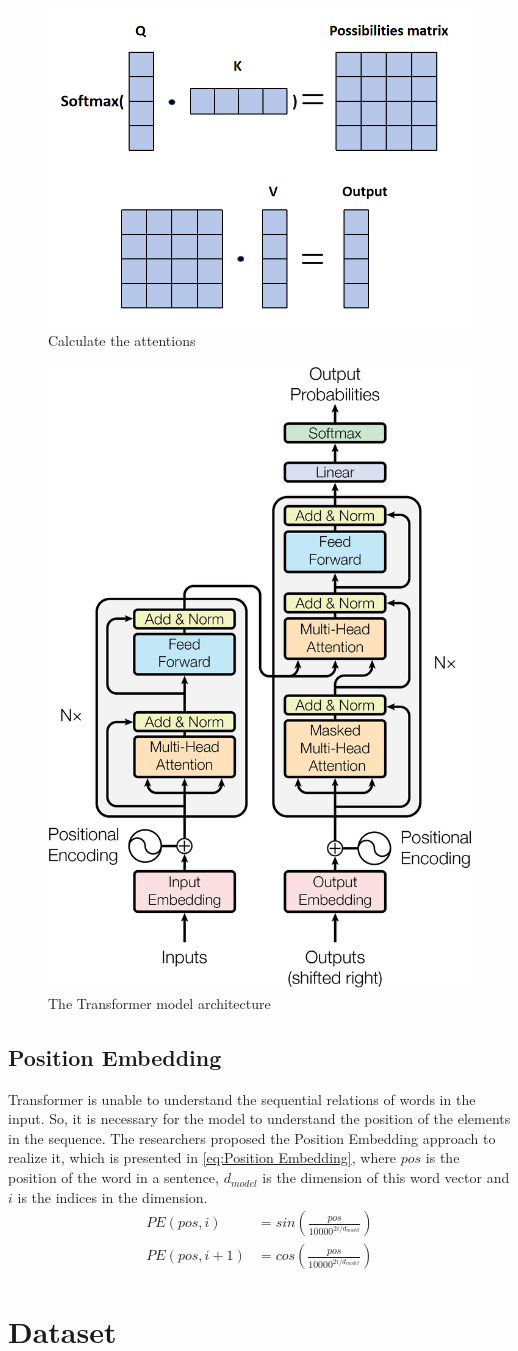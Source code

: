   \begin{figure}
    \centering
    \includegraphics[width=0.6\linewidth]{example_images/AttenCalculation}
    \caption{Calculate the attentions}
    \label{Calculate the attentions}
  \end{figure}
  \begin{figure}
    \centering
    \includegraphics[width=0.6\linewidth]{example_images/transformer}
    \caption{The Transformer model architecture\cite{NIPS2017_3f5ee243}}
    \label{The Transformer model architecture}
  \end{figure}
\subsection{Position Embedding}
  Transformer is unable to understand the sequential relations of  words in the input. So, it is necessary for the model to understand the position of the elements in the sequence.
  The researchers proposed the Position Embedding approach to realize it, which is presented in \autoref{eq:Position Embedding}, where $pos$ is the position of the word in a sentence,
  $d_{model}$ is the dimension of this word vector and $i$ is the indices in the dimension.   
  \begin{equation}
    \begin{aligned}
      PE(pos,i) &= sin(\frac{pos}{10000^{2i/d_{model}}})\\
      PE(pos,i+1) &= cos(\frac{pos}{10000^{2i/d_{model}}})
        \label{eq:Position Embedding}
    \end{aligned}
  \end{equation}

\section{Dataset}